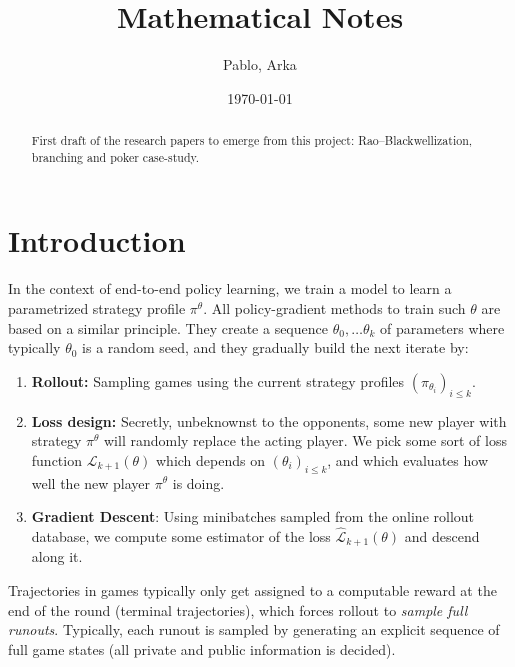 \documentclass[12pt, a4paper]{article}
\title{Mathematical Notes}
\author{Pablo, Arka}
\date{\today}
\begin{document}
\maketitle

\begin{abstract}
First draft of the research papers to emerge from this project: Rao--Blackwellization, branching and poker case-study.
\end{abstract}

\tableofcontents
\newpage

\section{Introduction}\label{sec:intro}

In the context of end-to-end policy learning, we train a model to learn a parametrized strategy profile $\pi^\theta$.
All policy-gradient methods to train such  $\theta$ are based on a similar principle.
They create a sequence $\theta_0, \ldots \theta_k$ of parameters where typically $\theta_0$ is a random seed, and they gradually build the next iterate by:  
\begin{enumerate}[label =(\roman*)]
  \item \textbf{Rollout:} Sampling games using the current strategy profiles $(\pi_{\theta_i})_{i\le k}$.
  \item \textbf{Loss design:} Secretly, unbeknownst to the opponents, some new player with strategy $\pi^\theta$ will randomly replace the acting player.
  We pick some sort of loss function $\mathcal{L}_{k+1}(\theta)$ which depends on $(\theta_i)_{i\le k}$, and which evaluates how well the new player $\pi^\theta$ is doing.
  \item \textbf{Gradient Descent}: Using minibatches sampled from the online rollout database, we compute some estimator of the loss $\widehat{\mathcal{L}}_{k+1}(\theta)$ and descend along it.
\end{enumerate}

Trajectories in games typically only get assigned to a computable reward at the end of the round (terminal trajectories), which forces rollout to \textit{sample full runouts}.
Typically, each runout is sampled by generating an explicit sequence of full game states (all private and public information is decided).
\end{document}
